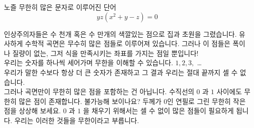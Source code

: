 ﻿\begin{surferPage}{노즐}
무한히 많은 문자로 이루어진 단어\\
\smallskip
\[y z (x^2	+ y - z)	= 0\]

\vspace{0.3cm}
인상주의자들은 수 천개 혹은 수 만개의 색깔있는 점으로 집과 초원을 그렸습니다. 유사하게 수학적 곡면은 무수히 많은 점들로 이루어져 있습니다. 그러나 이 점들은 폭이나 질량이 없는, 그저 식을 만족시키는 좌표를 가지는 점일 뿐입니다! \\
\vspace{0.3cm}
우리는 숫자를 하나씩 세어가며 무한을 이해할 수 있습니다. $1, 2, 3,$ \dots\\
우리가 말한 수보다 항상 더 큰 숫자가 존재하고 그 결과 우리는 절대 끝까지 셀 수 없습니다. \\
\vspace{0.3cm}
그러나 곡면만이 무한히 많은 점을 포함하는 건 아닙니다. 수직선의 $0$ 과 $1$ 사이에도 무한히 많은 점이 존재합니다. 불가능해 보이나요? 두께가 0인 연필로 그린 무한히 작은 점을 상상해 보세요. $0$ 과 $1$ 을 채우기 위해서는 셀 수 없이 많은 점들이 필요하게 됩니다. 우리는 이러한 것들을 무한이라고 부릅니다.
\end{surferPage}
